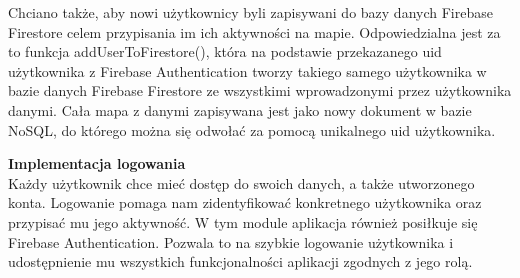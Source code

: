 Chciano także, aby nowi użytkownicy byli zapisywani do bazy danych Firebase Firestore celem przypisania im ich aktywności na mapie. Odpowiedzialna jest za to funkcja addUserToFirestore(), która na podstawie przekazanego uid użytkownika z Firebase Authentication tworzy takiego samego użytkownika w bazie danych Firebase Firestore ze wszystkimi wprowadzonymi przez użytkownika danymi. Cała mapa z danymi zapisywana jest jako nowy dokument w bazie NoSQL, do którego można się odwołać za pomocą unikalnego uid użytkownika.\\
\noindent
\setlength{\fboxrule}{0.5pt}
\begin{minipage}{\linewidth}
    \label{lst:addtofirestore}
    \centering
\end{minipage}

\noindent
\textbf{Implementacja logowania}\\
\indent Każdy użytkownik chce mieć dostęp do swoich danych, a także utworzonego konta. Logowanie pomaga nam zidentyfikować konkretnego użytkownika oraz przypisać mu jego aktywność. W tym module aplikacja również posiłkuje się Firebase Authentication. Pozwala to na szybkie logowanie użytkownika i udostępnienie mu wszystkich funkcjonalności aplikacji zgodnych z jego rolą.\\
\noindent
\setlength{\fboxrule}{0.5pt}
\begin{minipage}{\linewidth}
    \label{lst:login}
    \centering
\end{minipage}


